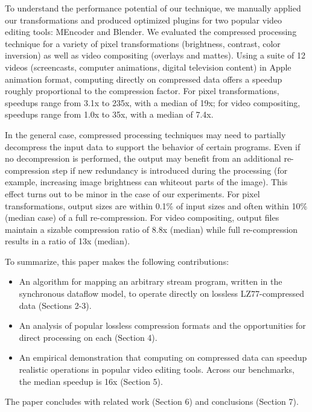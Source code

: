 To understand the performance potential of our technique, we manually
applied our transformations and produced optimized plugins for two
popular video editing tools: MEncoder and Blender.  We evaluated the
compressed processing technique for a variety of pixel transformations
(brightness, contrast, color inversion) as well as video compositing
(overlays and mattes).  Using a suite of 12 videos (screencasts,
computer animations, digital television content) in Apple animation
format, computing directly on compressed data offers a speedup roughly
proportional to the compression factor.  For pixel transformations,
speedups range from 3.1x to 235x, with a median of 19x; for video
compositing, speedups range from 1.0x to 35x, with a median of 7.4x.

In the general case, compressed processing techniques may need to
partially decompress the input data to support the behavior of certain
programs.  Even if no decompression is performed, the output may
benefit from an additional re-compression step if new redundancy is
introduced during the processing (for example, increasing image
brightness can whiteout parts of the image).  This effect turns out to
be minor in the case of our experiments.  For pixel transformations,
output sizes are within 0.1\% of input sizes and often within 10\%
(median case) of a full re-compression.  For video compositing, output
files maintain a sizable compression ratio of 8.8x (median) while full
re-compression results in a ratio of 13x (median).

To summarize, this paper makes the following contributions:
\begin{itemize}

\item An algorithm for mapping an arbitrary stream program, written in
the synchronous dataflow model, to operate directly on lossless
LZ77-compressed data (Sections 2-3).

\item An analysis of popular lossless compression formats and the
opportunities for direct processing on each (Section 4).

\item An empirical demonstration that computing on compressed data can
speedup realistic operations in popular video editing tools.  Across
our benchmarks, the median speedup is 16x (Section 5).

\end{itemize}

The paper concludes with related work (Section 6) and conclusions
(Section 7).
